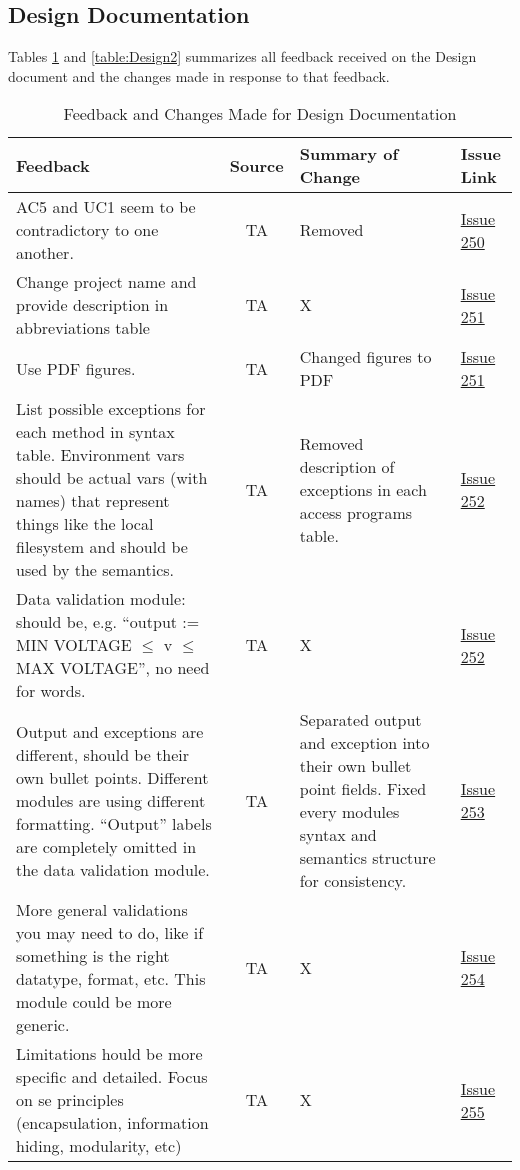 \documentclass{article}
\begin{document}
\subsection{Design Documentation}
Tables \ref{table:Design1} and \ref{table:Design2} summarizes all feedback
received on the Design document and the changes made in response to that
feedback.
\begin{table}[H]
\centering
\begin{tabularx}{\textwidth}{|X|c|X|p{1.5cm}|}
    \hline
    \textbf{Feedback} & \textbf{Source} & \textbf{Summary of Change} &
    \textbf{Issue Link} \\
    \hline
    AC5 and UC1 seem to be contradictory to one another. & TA & Removed &
    \href{https://github.com/SumanyaG/Alkalytics/issues/250}{Issue 250} \\
    \hline
    Change project name and provide description in abbreviations table & TA & X
    & \href{https://github.com/SumanyaG/Alkalytics/issues/251}{Issue 251} \\
    \hline
    Use PDF figures. & TA & Changed figures to PDF &
    \href{https://github.com/SumanyaG/Alkalytics/issues/251}{Issue 251} \\
    \hline
    List possible exceptions for each method in syntax table. Environment vars
    should be actual vars (with names) that represent things like the local
    filesystem and should be used by the semantics. & TA & Removed description
    of exceptions in each access programs table. &
    \href{https://github.com/SumanyaG/Alkalytics/issues/252}{Issue 252} \\
    \hline
    Data validation module: should be, e.g. ``output := MIN VOLTAGE $\le$ v
    $\le$ MAX VOLTAGE'', no need for words. & TA & X &
    \href{https://github.com/SumanyaG/Alkalytics/issues/252}{Issue 252} \\
    \hline
    Output and exceptions are different, should be their own bullet points.
    Different modules are using different formatting. ``Output'' labels are
    completely omitted in the data validation module. & TA & Separated output
    and exception into their own bullet point fields. Fixed every modules syntax
    and semantics structure for consistency. &
    \href{https://github.com/SumanyaG/Alkalytics/issues/253}{Issue 253} \\
    \hline
    More general validations you may need to do, like if something is the right
    datatype, format, etc. This module could be more generic. & TA & X &
    \href{https://github.com/SumanyaG/Alkalytics/issues/254}{Issue 254} \\
    \hline
    Limitations hould be more specific and detailed. Focus on se principles
    (encapsulation, information hiding, modularity, etc) & TA & X &
    \href{https://github.com/SumanyaG/Alkalytics/issues/255}{Issue 255} \\
    \hline
\end{tabularx}
\caption{Feedback and Changes Made for Design Documentation}
\label{table:Design1}
\end{table}
\end{document}
